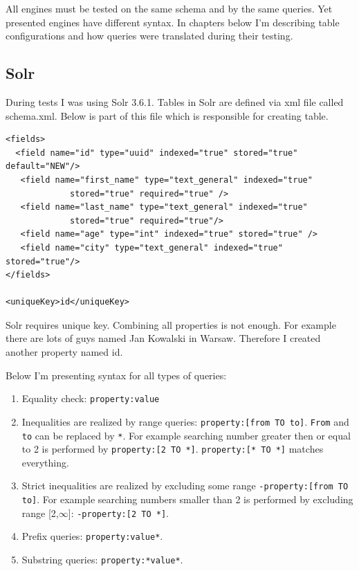 \documentclass[10pt,a4paper]{article}
\begin{document}
All engines must be tested on the same schema and by the same queries. Yet presented engines have different syntax. In chapters below I'm describing table configurations and how queries were translated during their testing.
\subsection{Solr}

During tests I was using Solr 3.6.1. Tables in Solr are defined via xml file called schema.xml. Below is part of this file which is responsible for creating table.

\begin{verbatim}
<fields>
  <field name="id" type="uuid" indexed="true" stored="true" default="NEW"/>
   <field name="first_name" type="text_general" indexed="true"
             stored="true" required="true" /> 
   <field name="last_name" type="text_general" indexed="true" 
             stored="true" required="true"/>
   <field name="age" type="int" indexed="true" stored="true" /> 
   <field name="city" type="text_general" indexed="true" stored="true"/>
</fields>

<uniqueKey>id</uniqueKey> 
\end{verbatim}

Solr requires unique key. Combining all properties is not enough. For example there are lots of guys named Jan Kowalski in Warsaw. Therefore I created another property named id.

\bigskip
Below I'm presenting syntax for all types of queries:
\begin{enumerate}
\item Equality check: \verb|property:value|
\item Inequalities are realized by range queries: \verb|property:[from TO to]|. \verb|From| and \verb|to| can be replaced by \verb|*|. For example searching number greater then or equal to 2 is performed by \verb|property:[2 TO *]|. \verb|property:[* TO *]| matches everything.
\item Strict inequalities are realized by excluding some range \verb|-property:[from TO to]|. For example searching numbers smaller than 2 is performed by excluding range [2,$\infty$]: \verb|-property:[2 TO *]|.
\item Prefix queries: \verb|property:value*|.
\item Substring queries: \verb|property:*value*|.
 
\end{enumerate}
\end{document}
